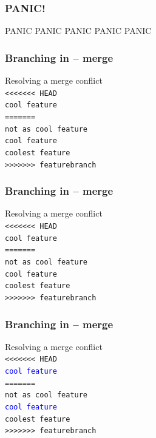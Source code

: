 \documentclass{beamer}
\begin{document}
\begin{frame}
  \frametitle{PANIC!}

    \begin{center}
        \Huge \alert{PANIC PANIC PANIC PANIC PANIC}
    \end{center}
\end{frame}

\begin{frame}
  \frametitle{Branching in -- merge} %

    Resolving a merge conflict \\[1em]

        \texttt{<<<<<<< HEAD} \\
        \texttt{cool feature} \\
        \texttt{=======} \\
        \texttt{not as cool feature} \\
        \texttt{cool feature} \\
        \texttt{coolest feature} \\
        \texttt{>>>>>>> featurebranch}
\end{frame}

\begin{frame}
  \frametitle{Branching in -- merge} %

    Resolving a merge conflict \\[1em]

        \alert{\texttt{<<<<<<< HEAD}} \\
        \texttt{cool feature} \\
        \alert{\texttt{=======}} \\
        \texttt{not as cool feature} \\
        \texttt{cool feature} \\
        \texttt{coolest feature} \\
        \alert{\texttt{>>>>>>> featurebranch}}
\end{frame}

\begin{frame}
  \frametitle{Branching in -- merge} %

    Resolving a merge conflict \\[1em]

        \texttt{<<<<<<< HEAD} \\
        \textcolor{blue}{\texttt{cool feature}} \\
        \texttt{=======} \\
        \texttt{not as cool feature} \\
        \textcolor{blue}{\texttt{cool feature}} \\
        \texttt{coolest feature} \\
        \texttt{>>>>>>> featurebranch}
\end{frame}
\end{document}
